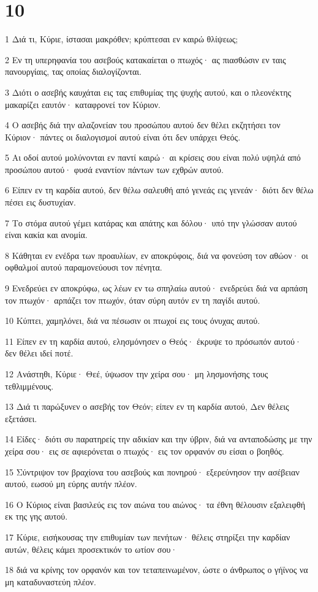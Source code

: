 \chapter{10}

\par 1 Διά τι, Κύριε, ίστασαι μακρόθεν; κρύπτεσαι εν καιρώ θλίψεως;
\par 2 Εν τη υπερηφανία του ασεβούς κατακαίεται ο πτωχός· ας πιασθώσιν εν ταις πανουργίαις, τας οποίας διαλογίζονται.
\par 3 Διότι ο ασεβής καυχάται εις τας επιθυμίας της ψυχής αυτού, και ο πλεονέκτης μακαρίζει εαυτόν· καταφρονεί τον Κύριον.
\par 4 Ο ασεβής διά την αλαζονείαν του προσώπου αυτού δεν θέλει εκζητήσει τον Κύριον· πάντες οι διαλογισμοί αυτού είναι ότι δεν υπάρχει Θεός.
\par 5 Αι οδοί αυτού μολύνονται εν παντί καιρώ· αι κρίσεις σου είναι πολύ υψηλά από προσώπου αυτού· φυσά εναντίον πάντων των εχθρών αυτού.
\par 6 Είπεν εν τη καρδία αυτού, δεν θέλω σαλευθή από γενεάς εις γενεάν· διότι δεν θέλω πέσει εις δυστυχίαν.
\par 7 Το στόμα αυτού γέμει κατάρας και απάτης και δόλου· υπό την γλώσσαν αυτού είναι κακία και ανομία.
\par 8 Κάθηται εν ενέδρα των προαυλίων, εν αποκρύφοις, διά να φονεύση τον αθώον· οι οφθαλμοί αυτού παραμονεύουσι τον πένητα.
\par 9 Ενεδρεύει εν αποκρύφω, ως λέων εν τω σπηλαίω αυτού· ενεδρεύει διά να αρπάση τον πτωχόν· αρπάζει τον πτωχόν, όταν σύρη αυτόν εν τη παγίδι αυτού.
\par 10 Κύπτει, χαμηλόνει, διά να πέσωσιν οι πτωχοί εις τους όνυχας αυτού.
\par 11 Είπεν εν τη καρδία αυτού, ελησμόνησεν ο Θεός· έκρυψε το πρόσωπόν αυτού· δεν θέλει ιδεί ποτέ.
\par 12 Ανάστηθι, Κύριε· Θεέ, ύψωσον την χείρα σου· μη λησμονήσης τους τεθλιμμένους.
\par 13 Διά τι παρώξυνεν ο ασεβής τον Θεόν; είπεν εν τη καρδία αυτού, Δεν θέλεις εξετάσει.
\par 14 Είδες· διότι συ παρατηρείς την αδικίαν και την ύβριν, διά να ανταποδώσης με την χείρα σου· εις σε αφιερόνεται ο πτωχός· εις τον ορφανόν συ είσαι ο βοηθός.
\par 15 Σύντριψον τον βραχίονα του ασεβούς και πονηρού· εξερεύνησον την ασέβειαν αυτού, εωσού μη εύρης αυτήν πλέον.
\par 16 Ο Κύριος είναι βασιλεύς εις τον αιώνα του αιώνος· τα έθνη θέλουσιν εξαλειφθή εκ της γης αυτού.
\par 17 Κύριε, εισήκουσας την επιθυμίαν των πενήτων· θέλεις στηρίξει την καρδίαν αυτών, θέλεις κάμει προσεκτικόν το ωτίον σου·
\par 18 διά να κρίνης τον ορφανόν και τον τεταπεινωμένον, ώστε ο άνθρωπος ο γήϊνος να μη καταδυναστεύη πλέον.

